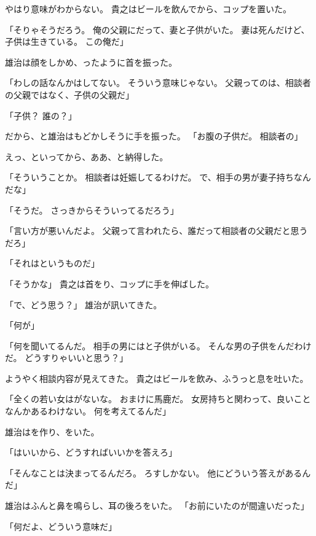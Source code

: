 \documentclass[chapter3.tex]{subfiles}
\begin{document}
\begin{CJK}{UTF8}{ipxm}
    やはり意味がわからない。
    貴之はビールを飲んでから、コップを置いた。

    「そりゃそうだろう。
    俺の父親にだって、妻と子供がいた。
    妻は死んだけど、子供は生きている。
    この俺だ」

    雄治は顔をしかめ、ったように首を振った。

    「わしの話なんかはしてない。
    そういう意味じゃない。
    父親ってのは、相談者の父親ではなく、子供の父親だ」

    「子供？
    誰の？」

    だから、と雄治はもどかしそうに手を振った。
    「お腹の子供だ。
    相談者の」

    えっ、といってから、ああ、と納得した。

    「そういうことか。
    相談者は妊娠してるわけだ。
    で、相手の男が妻子持ちなんだな」

    「そうだ。
    さっきからそういってるだろう」

    「言い方が悪いんだよ。
    父親って言われたら、誰だって相談者の父親だと思うだろ」

    「それはというものだ」

    「そうかな」
    貴之は首をり、コップに手を伸ばした。
    
    「で、どう思う？」
    雄治が訊いてきた。

    「何が」

    「何を聞いてるんだ。
    相手の男にはと子供がいる。
    そんな男の子供をんだわけだ。
    どうすりゃいいと思う？」


    ようやく相談内容が見えてきた。
    貴之はビールを飲み、ふうっと息を吐いた。

    「全くの若い女はがないな。
    おまけに馬鹿だ。
    女房持ちと関わって、良いことなんかあるわけない。
    何を考えてるんだ」

    雄治はを作り、をいた。

    「はいいから、どうすればいいかを答えろ」

    「そんなことは決まってるんだろ。
    ろすしかない。
    他にどういう答えがあるんだ」

    雄治はふんと鼻を鳴らし、耳の後ろをいた。
    「お前にいたのが間違いだった」

    「何だよ、どういう意味だ」


\end{CJK}
\end{document}
